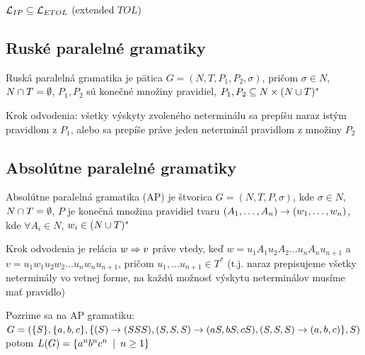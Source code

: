 \begin{veta}
  $\mathcal{L}_{IP} \subseteq \mathcal{L}_{ETOL}$ (extended $TOL$)
\end{veta}

\subsection{Ruské paralelné gramatiky}

\begin{definicia}
  Ruská paralelná gramatika je pätica $G=(N,T,P_{1},P_{2},\sigma)$,
  pričom $\sigma\in N$, \mbox{$N\cap T=\emptyset$}, $P_{1}, P_{2}$
  sú konečné množiny pravidiel, $P_{1},P_{2}\subseteq N\times(N\cup
  T)^{*}$
\end{definicia}

\begin{definicia}
  Krok odvodenia: všetky výskyty zvoleného neterminálu sa prepíšu
  naraz istým pravidlom z $P_{1}$, alebo sa prepíše práve jeden
  neterminál pravidlom z množiny $P_{2}$
\end{definicia}

\subsection{Absolútne paralelné gramatiky}

\begin{definicia}
  Absolútne paralelná gramatika (AP) je štvorica $G=(N,T,P,\sigma)$,
  kde \mbox{$\sigma\in N$}, $N\cap T=\emptyset$, $P$ je konečná
  množina pravidiel tvaru
  $(A_{1},\dots,A_{n})\rightarrow(w_{1},\dots,w_{n})$, kde \mbox{$\forall
  A_{i}\in N$}, $w_{i}\in(N\cup T)^{*}$
\end{definicia}

\begin{definicia}
  Krok odvodenia je relácia $w\Rightarrow v$ práve vtedy, keď
  $w=u_{1}A_{1}u_{2}A_{2}\dots u_{n}A_{n}u_{n+1}$ \mbox{a
  $v=u_{1}w_{1}u_{2}w_{2}\dots u_{n}w_{n}u_{n+1}$}, pričom
  $u_{1},\dots u_{n+1}\in T^{*}$ (t.j. naraz prepisujeme všetky
  neterminály vo vetnej forme, na každú možnosť výskytu neterminálov
  musíme mať pravidlo)
\end{definicia}

\begin{priklad}
  Pozrime sa na AP gramatiku:\\
  $G=(\{S\},\{a,b,c\},\{(S)\rightarrow(SSS),(S,S,S)\rightarrow (aS,bS,cS),(S,S,S)\rightarrow
  (a,b,c)\},S)$ potom $L(G)=\{a^{n}b^{n}c^{n}\enspace |\enspace n\geq1\}$
\end{priklad}

